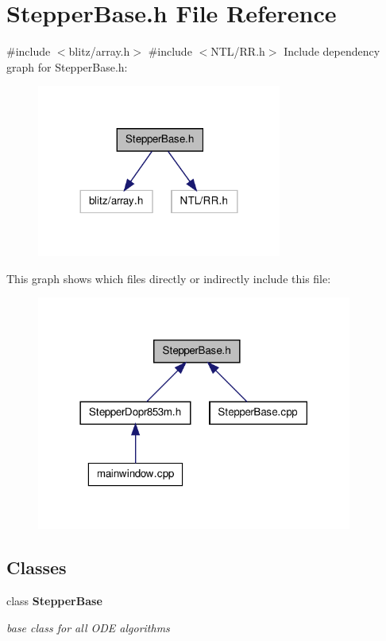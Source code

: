 \section{\-Stepper\-Base.\-h \-File \-Reference}
\label{_stepper_base_8h}
{\ttfamily \#include $<$blitz/array.\-h$>$}\*
{\ttfamily \#include $<$\-N\-T\-L/\-R\-R.\-h$>$}\*
\-Include dependency graph for \-Stepper\-Base.\-h\-:
\nopagebreak
\begin{figure}[H]
\begin{center}
\leavevmode
\includegraphics[width=228pt]{_stepper_base_8h__incl}
\end{center}
\end{figure}
\-This graph shows which files directly or indirectly include this file\-:
\nopagebreak
\begin{figure}[H]
\begin{center}
\leavevmode
\includegraphics[width=294pt]{_stepper_base_8h__dep__incl}
\end{center}
\end{figure}
\subsection*{\-Classes}
\begin{DoxyCompactItemize}
\item 
class {\bf \-Stepper\-Base}
\begin{DoxyCompactList}\small\item\em base class for all \-O\-D\-E algorithms \end{DoxyCompactList}\end{DoxyCompactItemize}
